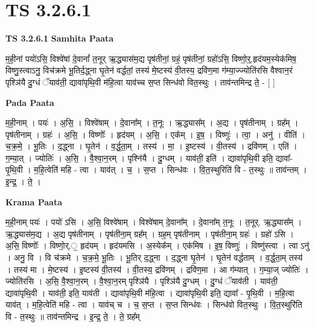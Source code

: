 \documentclass[17pt]{extarticle}
\begin{document}
\section{ TS 3.2.6.1 }

\textbf{TS 3.2.6.1 } \newline
\textbf{Samhita Paata} \newline

म॒ही॒नां पयो॑ऽसि॒ विश्वे॑षां दे॒वानां᳚ त॒नूर् ऋ॒द्ध्यास॑म॒द्य पृष॑तीनां॒ ग्रहं॒ पृष॑तीनां॒ ग्रहो॑ऽसि॒ विष्णो॒र्॒.हृद॑यम॒स्येक॑मिष॒ विष्णु॒स्त्वाऽनु॒ विच॑क्रमे भू॒तिर्द॒द्ध्ना घृ॒तेन॑ वर्द्धतां॒ तस्य॑ मे॒ष्टस्य॑ वी॒तस्य॒ द्रवि॑ण॒मा ग॑म्या॒ज्ज्योति॑रसि वैश्वान॒रं पृश्ञि॑यै दु॒ग्धं ॅयाव॑ती॒ द्यावा॑पृथि॒वी म॑हि॒त्वा याव॑च्च स॒प्त सिन्ध॑वो वित॒स्थुः । ताव॑न्तमिन्द्र ते॒ - [  ] \newline

\textbf{Pada Paata} \newline

म॒ही॒नाम् । पयः॑ । अ॒सि॒ । विश्वे॑षाम् । दे॒वाना᳚म् । त॒नूः । ऋ॒द्ध्यास᳚म् । अ॒द्य । पृष॑तीनाम् । ग्रह᳚म् । पृष॑तीनाम् । ग्रहः॑ । अ॒सि॒ । विष्णोः᳚ । हृद॑यम् । अ॒सि॒ । एक᳚म् । इ॒ष॒ । विष्णुः॑ । त्वा॒ । अनु॑ । वीति॑ । च॒क्र॒मे॒ । भू॒तिः । द॒द्ध्ना । घृ॒तेन॑ । व॒र्द्ध॒ता॒म् । तस्य॑ । मा॒ । इ॒ष्टस्य॑ । वी॒तस्य॑ । द्रवि॑णम् । एति॑ । ग॒म्या॒त् । ज्योतिः॑ । अ॒सि॒ । वै॒श्वा॒न॒रम् । पृश्नि॑यै । दु॒ग्धम् । याव॑ती॒ इति॑ । द्यावा॑पृथि॒वी इति॒ द्यावा᳚-पृ॒थि॒वी । म॒हि॒त्वेति॑ महि - त्वा । याव॑त् । च॒ । स॒प्त । सिन्ध॑वः । वि॒त॒स्थुरिति॑ वि - त॒स्थुः ॥ ताव॑न्तम् । इ॒न्द्र॒ । ते॒ ।  \newline


\textbf{Krama Paata} \newline

म॒ही॒नाम् पयः॑ । पयो॑ ऽसि । अ॒सि॒ विश्वे॑षाम् । विश्वे॑षाम् दे॒वाना᳚म् । दे॒वाना᳚म् त॒नूः । त॒नूर्. ऋ॒द्ध्यास᳚म् । ऋ॒द्ध्यास॑म॒द्य । अ॒द्य पृष॑तीनाम् । पृष॑तीना॒म् ग्रह᳚म् । ग्रह॒म् पृष॑तीनाम् । पृष॑तीना॒म् ग्रहः॑ । ग्रहो॑ ऽसि । अ॒सि॒ विष्णोः᳚ । विष्णो॒र्.॒ हृद॑यम् । हृद॑यमसि । अ॒स्येक᳚म् । एक॑मिष । इ॒ष॒ विष्णुः॑ । विष्णु॑स्त्वा । त्वा ऽनु॑ । अनु॒ वि । वि च॑क्रमे । च॒क्र॒मे॒ भू॒तिः । भू॒तिर् द॒द्ध्ना । द॒द्ध्ना घृ॒तेन॑ । घृ॒तेन॑ वर्द्धताम् । व॒र्द्ध॒ता॒म् तस्य॑ । तस्य॑ मा । मे॒ष्टस्य॑ । इ॒ष्टस्य॑ वी॒तस्य॑ । वी॒तस्य॒ द्रवि॑णम् । द्रवि॑ण॒मा । आ ग॑म्यात् । ग॒म्या॒ज् ज्योतिः॑ । ज्योति॑रसि । अ॒सि॒ वै॒श्वा॒न॒रम् । वै॒श्वा॒न॒रम् पृश्ञि॑यै । पृश्ञि॑यै दु॒ग्धम् । दु॒ग्धं ॅयाव॑ती । याव॑ती॒ द्यावा॑पृथि॒वी । याव॑ती॒ इति॒ याव॑ती । द्यावा॑पृथि॒वी म॑हि॒त्वा । द्यावा॑पृथि॒वी इति॒ द्यावा᳚ - पृ॒थि॒वी । म॒हि॒त्वा याव॑त् । म॒हि॒त्वेति॑ महि - त्वा । याव॑च् च । च॒ स॒प्त । स॒प्त सिन्ध॑वः । सिन्ध॑वो वित॒स्थुः । वि॒त॒स्थुरि॑ति वि - त॒स्थुः ॥ ताव॑न्तमिन्द्र । इ॒न्द्र॒ ते॒ । ते॒ ग्रह᳚म् \newline
\end{document}
